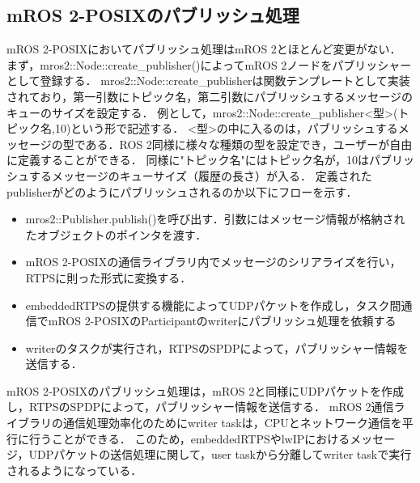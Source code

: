 \subsection{mROS 2-POSIXのパブリッシュ処理}
mROS 2-POSIXにおいてパブリッシュ処理はmROS 2とほとんど変更がない．
まず，mros2::Node::create\_publisher()によってmROS 2ノードをパブリッシャーとして登録する．
mros2::Node::create\_publisherは関数テンプレートとして実装されており，第一引数にトピック名，第二引数にパブリッシュするメッセージのキューのサイズを設定する．
例として，mros2::Node::create\_publisher<型>(トピック名,10)という形で記述する．
<型>の中に入るのは，パブリッシュするメッセージの型である．ROS 2同様に様々な種類の型を設定でき，ユーザーが自由に定義することができる．
同様に"トピック名"にはトピック名が，10はパブリッシュするメッセージのキューサイズ（履歴の長さ）が入る．
定義されたpublisherがどのようにパブリッシュされるのか以下にフローを示す．
\begin{itemize}
    \item mros2::Publisher.publish()を呼び出す．引数にはメッセージ情報が格納されたオブジェクトのポインタを渡す．
    \item mROS 2-POSIXの通信ライブラリ内でメッセージのシリアライズを行い，RTPSに則った形式に変換する．
    \item embeddedRTPSの提供する機能によってUDPパケットを作成し，タスク間通信でmROS 2-POSIXのParticipantのwriterにパブリッシュ処理を依頼する
    \item writerのタスクが実行され，RTPSのSPDPによって，パブリッシャー情報を送信する．
\end{itemize}
mROS 2‐POSIXのパブリッシュ処理は，mROS 2と同様にUDPパケットを作成し，RTPSのSPDPによって，パブリッシャー情報を送信する．
mROS 2通信ライブラリの通信処理効率化のためにwriter taskは，CPUとネットワーク通信を平行に行うことができる．
このため，embeddedRTPSやlwIPにおけるメッセージ，UDPパケットの送信処理に関して，user taskから分離してwriter taskで実行されるようになっている．
